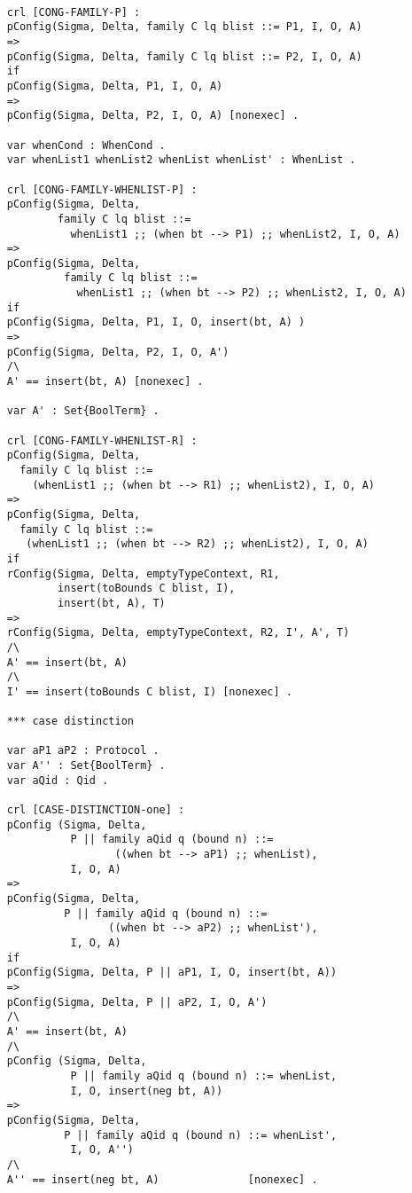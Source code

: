 \begin{lstlisting}
           
     crl [CONG-FAMILY-P] : 
     pConfig(Sigma, Delta, family C lq blist ::= P1, I, O, A)
     => 
     pConfig(Sigma, Delta, family C lq blist ::= P2, I, O, A)
     if
     pConfig(Sigma, Delta, P1, I, O, A)
     =>
     pConfig(Sigma, Delta, P2, I, O, A) [nonexec] .
    
     var whenCond : WhenCond .
     var whenList1 whenList2 whenList whenList' : WhenList .
     
     crl [CONG-FAMILY-WHENLIST-P] : 
     pConfig(Sigma, Delta, 
             family C lq blist ::= 
               whenList1 ;; (when bt --> P1) ;; whenList2, I, O, A)
     => 
     pConfig(Sigma, Delta, 
              family C lq blist ::= 
                whenList1 ;; (when bt --> P2) ;; whenList2, I, O, A) 
     if 
     pConfig(Sigma, Delta, P1, I, O, insert(bt, A) )
     =>  
     pConfig(Sigma, Delta, P2, I, O, A')
     /\ 
     A' == insert(bt, A) [nonexec] . 

     var A' : Set{BoolTerm} . 

     crl [CONG-FAMILY-WHENLIST-R] : 
     pConfig(Sigma, Delta, 
       family C lq blist ::= 
         (whenList1 ;; (when bt --> R1) ;; whenList2), I, O, A)
     => 
     pConfig(Sigma, Delta, 
       family C lq blist ::= 
        (whenList1 ;; (when bt --> R2) ;; whenList2), I, O, A) 
     if 
     rConfig(Sigma, Delta, emptyTypeContext, R1, 
             insert(toBounds C blist, I), 
             insert(bt, A), T)
     =>  
     rConfig(Sigma, Delta, emptyTypeContext, R2, I', A', T)
     /\
     A' == insert(bt, A) 
     /\
     I' == insert(toBounds C blist, I) [nonexec] . 

     *** case distinction
     
     var aP1 aP2 : Protocol .
     var A'' : Set{BoolTerm} .
     var aQid : Qid .
     
     crl [CASE-DISTINCTION-one] :
     pConfig (Sigma, Delta, 
               P || family aQid q (bound n) ::= 
                      ((when bt --> aP1) ;; whenList),
               I, O, A)
     => 
     pConfig(Sigma, Delta, 
              P || family aQid q (bound n) ::= 
                     ((when bt --> aP2) ;; whenList'),
               I, O, A) 
     if 
     pConfig(Sigma, Delta, P || aP1, I, O, insert(bt, A))
     =>
     pConfig(Sigma, Delta, P || aP2, I, O, A')
     /\
     A' == insert(bt, A)
     /\
     pConfig (Sigma, Delta, 
               P || family aQid q (bound n) ::= whenList,
               I, O, insert(neg bt, A)) 
     =>
     pConfig(Sigma, Delta, 
              P || family aQid q (bound n) ::= whenList',
               I, O, A'')
     /\
     A'' == insert(neg bt, A)              [nonexec] .   
               

\end{lstlisting}
